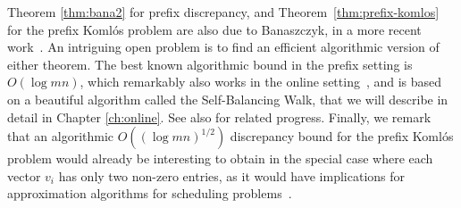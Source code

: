 Theorem \ref{thm:bana2} for prefix discrepancy, and
Theorem~\ref{thm:prefix-komlos} for the prefix Koml\'os problem are
also due to Banaszczyk, in a more recent work~\cite{B12}. An intriguing open problem is to
find an efficient algorithmic version of either theorem. The
best known algorithmic bound in the prefix setting is $O(\log mn)$, which
remarkably also works in the online
setting~\cite{alweiss2020discrepancy}, and is based on a beautiful algorithm called the Self-Balancing Walk, that we will describe in detail
in Chapter \ref{ch:online}.  See also \cite{rothvoss-online,
  ChewiGRT22, LiuSS22} for related progress. 
  Finally, we remark that an algorithmic
$O((\log mn)^{1/2})$ discrepancy bound for the prefix Koml\'{o}s
problem would already be interesting to obtain in the special case
where each vector $v_i$ has only two non-zero entries, as it would
have implications for approximation algorithms for scheduling
problems~\cite{BansalRS22}.












